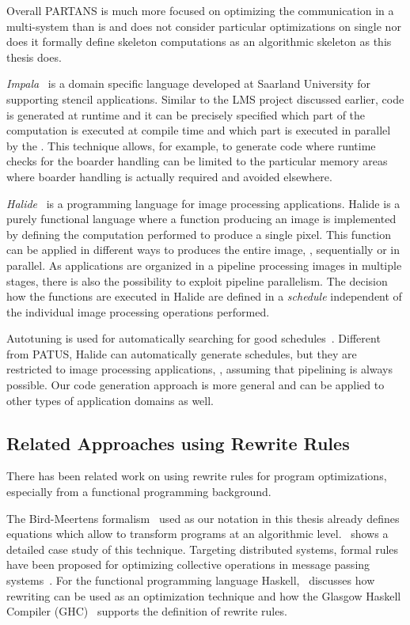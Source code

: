 Overall {\small PARTANS} is much more focused on optimizing the communication in a multi-\GPU system than \SkelCL is and does not consider particular optimizations on single \GPUs nor does it formally define skeleton computations as an algorithmic skeleton as this thesis does.

\bigskip
\emph{Impala}~\cite{KosterLHMS14} is a domain specific language developed at Saarland University for supporting stencil applications.
Similar to the {\small LMS} project discussed earlier, code is generated at runtime and it can be precisely specified which part of the computation is executed at compile time and which part is executed in parallel by the \GPU.
This technique allows, for example, to generate \GPU code where runtime checks for the boarder handling can be limited to the particular memory areas where boarder handling is actually required and avoided elsewhere.

\bigskip

\emph{Halide}~\cite{Ragan-KelleyAPLAD12,Ragan-KelleyBAPDA13} is a programming language for image processing applications.
Halide is a purely functional language where a function producing an image is implemented by defining the computation performed to produce a single pixel.
This function can be applied in different ways to produces the entire image, \eg, sequentially or in parallel.
As applications are organized in a pipeline processing images in multiple stages, there is also the possibility to exploit pipeline parallelism.
The decision how the functions are executed in Halide are defined in a \emph{schedule} independent of the individual image processing operations performed.

Autotuning is used for automatically searching for good schedules~\cite{Ragan-KelleyBAPDA13}.
Different from {\small PATUS}, Halide can automatically generate schedules, but they are restricted to image processing applications, \eg, assuming that pipelining is always possible.
Our code generation approach is more general and can be applied to other types of application domains as well.

\subsection{Related Approaches using Rewrite Rules}
There has been related work on using rewrite rules for program optimizations, especially from a functional programming background.

\bigskip

The Bird-Meertens formalism~\cite{Bird88} used as our notation in this thesis already defines equations which allow to transform programs at an algorithmic level.
\cite{Gorlatch96}~shows a detailed case study of this technique.
Targeting distributed systems, formal rules have been proposed for optimizing collective operations in message passing systems~\cite{GorlatchWL99,Gorlatch00,Gorlatch04}.
For the functional programming language Haskell, \cite{JonesToHo2001}~discusses how rewriting can be used as an optimization technique and how the Glasgow Haskell Compiler ({\small GHC})~\cite{HudakHJW07} supports the definition of rewrite rules.

